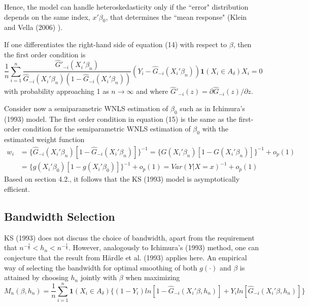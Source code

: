 \documentclass[a4paper]{article}
\begin{document}
Hence, the model can handle heteroskedasticity only if the ``error" distribution depends on the same index, $ x'\beta_0$, that determines the ``mean response" (Klein and Vella (2006) \cite{[25]}).

If one differentiates the right-hand side of equation (14) with respect to $\beta$, then the first order condition is
\begin{equation}
\frac{1}{n} \sum_{i=1}^n \frac{\hat{G}'_{-i}(X_i'\beta_n)}{\hat{G}_{-i}(X_i'\beta_n)(1 - \hat{G}_{-i}(X_i'\beta_n))} (Y_i - \hat{G}_{-i}(X_i'\beta_n)) \mathbf{1}{(X_i \in A_\delta)} X_i = 0
\end{equation} 
with probability approaching 1 as $n \rightarrow \infty$ and where $\hat{G}'_{-i}(z) = \partial \hat{G}_{-i}(z) / \partial z$.

Consider now a semiparametric WNLS estimation of $\beta_0$ such as in Ichimura's (1993) \cite{[6]} model. The first order condition in equation (15) is the same as the first-order condition for the semiparametric WNLS estimation of $\beta_0$ with the estimated weight function
\begin{align*}
w_i & = \{ \hat{G}_{-i}(X_i'\beta_n)[ 1 - \hat{G}_{-i}(X_i'\beta_n)]\}^{-1} = \{ G(X_i'\beta_n)[ 1 - G(X_i'\beta_n)]\}^{-1} + o_p(1) \\
     & = \{ g(X_i'\beta_0)[ 1 - g(X_i'\beta_0)]\}^{-1} + o_p(1) = Var(Y|X = x)^{-1} + o_p(1)
\end{align*}
Based on section 4.2., it follows that the KS (1993) \cite{[12]} model is asymptotically efficient.

\subsection{Bandwidth Selection} %
\label{sub:Bandwidth Selection}
KS (1993) \cite{[12]} does not discuss the choice of bandwidth, apart from the requirement that $ n^{-\frac{1}{6}} < h_n < n^{-\frac{1}{8}}$. However, analogously to Ichimura's (1993) \cite{[6]} method, one can conjecture that the result from H{\"a}rdle et al. (1993) \cite{[18]} applies here. An empirical way of selecting the bandwidth for optimal smoothing of both $g(\cdot)$ and $\beta$ is attained by choosing $h_n$ jointly with $\beta$ when maximizing
\begin{equation}
M_n(\beta, h_n) = \frac{1}{n}\sum_{i=1}^n \mathbf{1}{(X_i \in A_\delta)}\{ (1 - Y_i)ln[ 1 - \hat{G}_{-i}(X_i'\beta, h_n)] +  Y_iln[\hat{G}_{-i}(X_i'\beta, h_n)]\}
\end{equation}
\end{document}
